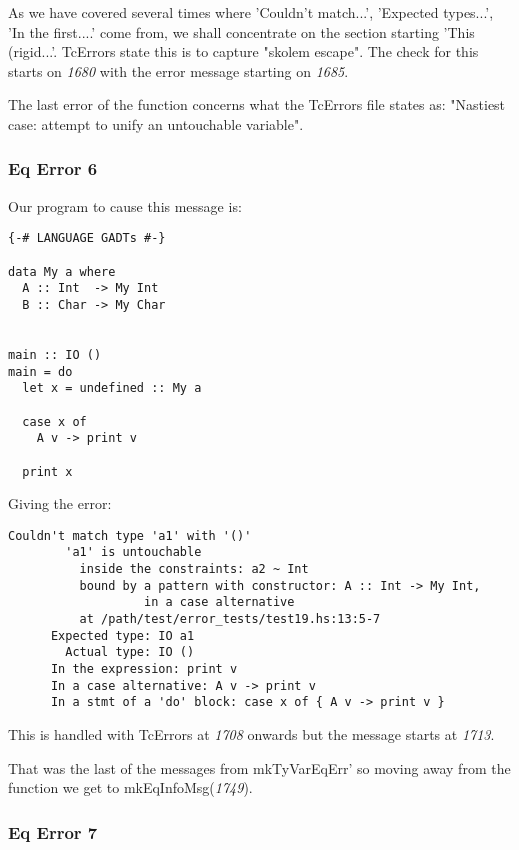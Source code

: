 \documentclass[a4paper]{article}
\begin{document}
As we have covered several times where 'Couldn't match...', 'Expected types...', 'In the first....' come from, we shall concentrate on the section starting 'This (rigid...'. TcErrors state this is to capture "skolem escape". The check for this starts on \textit{1680} with the error message starting on \textit{1685}. 

The last error of the function concerns what the TcErrors file states as: "Nastiest case: attempt to unify an untouchable variable". 


\subsubsection{Eq Error 6}


Our program to cause this message is:

\begin{lstlisting}[label={lst: T12.0}, numbers=none, caption={Example Program \cite{ex12}}]
{-# LANGUAGE GADTs #-}

data My a where
  A :: Int  -> My Int
  B :: Char -> My Char


main :: IO ()
main = do
  let x = undefined :: My a

  case x of
    A v -> print v

  print x
\end{lstlisting}
\hfill \break
\hfill \break
Giving the error:

\begin{lstlisting}[label={lst: T12.0.2}, numbers=none, caption={Error}]
Couldn't match type 'a1' with '()'
        'a1' is untouchable
          inside the constraints: a2 ~ Int
          bound by a pattern with constructor: A :: Int -> My Int,
                   in a case alternative
          at /path/test/error_tests/test19.hs:13:5-7
      Expected type: IO a1
        Actual type: IO ()
      In the expression: print v
      In a case alternative: A v -> print v
      In a stmt of a 'do' block: case x of { A v -> print v }
\end{lstlisting}

This is handled with TcErrors at \textit{1708} onwards but the message starts at \textit{1713}. 


That was the last of the messages from mkTyVarEqErr' so moving away from the function we get to mkEqInfoMsg(\textit{1749}).

\subsubsection{Eq Error 7}
\end{document}
